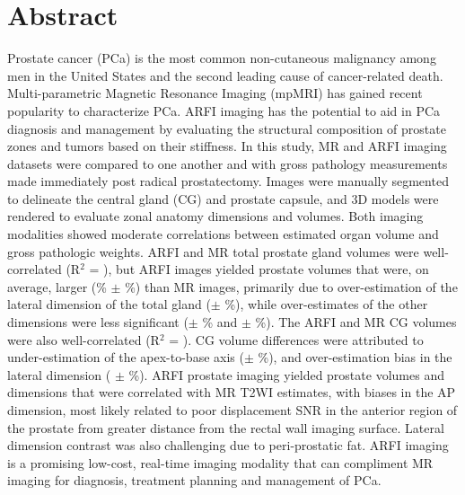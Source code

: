 \section*{Abstract}
Prostate cancer (PCa) is the most common non-cutaneous malignancy among men in
the United States and the second leading cause of cancer-related death.
Multi-parametric Magnetic Resonance Imaging (mpMRI) has gained recent
popularity to characterize PCa.  ARFI imaging has the potential to aid in PCa
diagnosis and management by evaluating the structural composition of prostate
zones and tumors based on their stiffness.  In this study, MR and ARFI imaging
datasets were compared to one another and with gross pathology measurements
made immediately post radical prostatectomy.  Images were manually segmented to
delineate the central gland (CG) and prostate capsule, and 3D models were
rendered to evaluate zonal anatomy dimensions and volumes.  Both imaging
modalities showed moderate correlations between estimated organ volume and
gross pathologic weights.  ARFI and MR total prostate gland volumes were
well-correlated (R$^2$ = \MRarfiVolTotalRsq), but ARFI images yielded prostate
volumes that were, on average, larger (\MRarfiVolTotalMeanDiff\% $\pm$
\MRarfiVolTotalStdDiff\%) than MR images, primarily due to over-estimation of
the lateral dimension of the total gland (\ARFImrTotalLatLatMeanPct $\pm$
\ARFImrTotalLatLatStdPct\%), while over-estimates of the other dimensions were
less significant (\ARFImrTotalAntPostMeanPct $\pm$ \ARFImrTotalAntPostStdPct\%
and \ARFImrTotalApexBaseMeanPct $\pm$ \ARFImrTotalApexBaseStdPct\%).  The ARFI
and MR CG volumes were also well-correlated (R$^2$ = \MRarfiVolCentralRsq).  CG
volume differences were attributed to under-estimation of the apex-to-base axis
(\ARFImrCentralApexBaseMeanPct $\pm$ \ARFImrCentralApexBaseStdPct\%), and
over-estimation bias in the lateral dimension (\ARFImrCentralLatLatMeanPct
$\pm$ \ARFImrCentralLatLatStdPct\%).  ARFI prostate imaging yielded prostate
volumes and dimensions that were correlated with MR T2WI estimates, with biases
in the AP dimension, most likely related to poor displacement SNR in the
anterior region of the prostate from greater distance from the rectal wall
imaging surface.  Lateral dimension contrast was also challenging due to
peri-prostatic fat.  ARFI imaging is a promising low-cost, real-time imaging
modality that can compliment MR imaging for diagnosis, treatment planning and
management of PCa.
